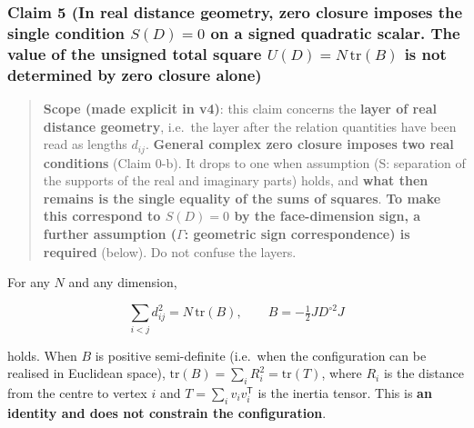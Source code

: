 \documentclass[
  10pt,
]{article}
\begin{document}
\subsubsection{\texorpdfstring{Claim 5 (In real distance geometry, zero
closure imposes the single condition \(S(D)=0\) on a signed quadratic
scalar. The value of the unsigned total square
\(U(D)=N\,\mathrm{tr}(B)\) is not determined by zero closure
alone)}{Claim 5 (In real distance geometry, zero closure imposes the single condition S(D)=0 on a signed quadratic scalar. The value of the unsigned total square U(D)=N\textbackslash,\textbackslash mathrm\{tr\}(B) is not determined by zero closure alone)}}\label{claim-5-in-real-distance-geometry-zero-closure-imposes-the-single-condition-sd0-on-a-signed-quadratic-scalar.-the-value-of-the-unsigned-total-square-udnmathrmtrb-is-not-determined-by-zero-closure-alone}

\begin{quote}
\textbf{Scope (made explicit in v4)}: this claim concerns the
\textbf{layer of real distance geometry}, i.e.~the layer after the
relation quantities have been read as lengths \(d_{ij}\).
\textbf{General complex zero closure imposes two real conditions} (Claim
0-b). It drops to one when assumption (S: separation of the supports of
the real and imaginary parts) holds, and \textbf{what then remains is
the single equality of the sums of squares}. \textbf{To make this
correspond to \(S(D)=0\) by the face-dimension sign, a further
assumption (\(\Gamma\): geometric sign correspondence) is required}
(below). Do not confuse the layers.
\end{quote}

For any \(N\) and any dimension,

\[\sum_{i<j} d_{ij}^2 = N\,\mathrm{tr}(B), \qquad B = -\tfrac12 J D^{\circ2} J\]

holds. When \(B\) is positive semi-definite (i.e.~when the configuration
can be realised in Euclidean space),
\(\mathrm{tr}(B) = \sum_i R_i^2 = \mathrm{tr}(T)\), where \(R_i\) is the
distance from the centre to vertex \(i\) and
\(T = \sum_i v_iv_i^{\mathsf T}\) is the inertia tensor. This is
\textbf{an identity and does not constrain the configuration}.
\end{document}
